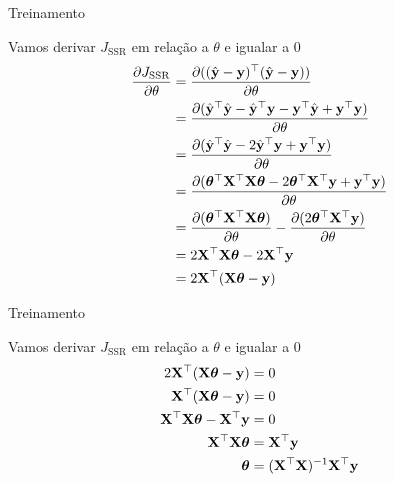 \documentclass[aspectratio=169,xcolor=dvipsnames]{beamer}
\begin{document}
\begin{frame}{Treinamento}
    
        Vamos derivar $J_{\text{SSR}}$ em relação a $\theta$ e igualar a 0
        \begin{align*}
            \frac{\partial J_{\text{SSR}}}{\partial\theta}&=\frac{\partial ((\hat{\mathbf{y}} - \mathbf{y})^\top(\hat{\mathbf{y}} - \mathbf{y}))}{\partial\theta}\\
            &=\frac{\partial (\hat{\mathbf{y}}^\top\hat{\mathbf{y}} - \hat{\mathbf{y}}^\top\mathbf{y}-\mathbf{y}^\top\hat{\mathbf{y}} + \mathbf{y}^\top\mathbf{y})}{\partial\theta}\\
            &=\frac{\partial (\hat{\mathbf{y}}^\top\hat{\mathbf{y}} - 2\hat{\mathbf{y}}^\top\mathbf{y} + \mathbf{y}^\top\mathbf{y})}{\partial\theta}\\
            &=\frac{\partial (\bm{\theta}^\top\mathbf{X}^\top\mathbf{X}\bm{\theta} - 2\bm{\theta}^\top\mathbf{X}^\top\mathbf{y} + \mathbf{y}^\top\mathbf{y})}{\partial\theta}\\
            &=\frac{\partial (\bm{\theta}^\top\mathbf{X}^\top\mathbf{X}\bm{\theta})}{\partial\theta} - \frac{\partial(2\bm{\theta}^\top\mathbf{X}^\top\mathbf{y})}{\partial\theta}\\
            &=2\mathbf{X}^\top\mathbf{X}\bm{\theta} - 2\mathbf{X}^\top\mathbf{y}\\
            &=2\mathbf{X}^\top(\mathbf{X}\bm{\theta} - \mathbf{y})
        \end{align*}
\end{frame}

\begin{frame}{Treinamento}
    
        Vamos derivar $J_{\text{SSR}}$ em relação a $\theta$ e igualar a 0
        \begin{align*}
            2\mathbf{X}^\top(\mathbf{X}\bm{\theta} - \mathbf{y}) &= 0\\
            \mathbf{X}^\top(\mathbf{X}\bm{\theta} - \mathbf{y}) &= 0\\
            \mathbf{X}^\top\mathbf{X}\bm{\theta} - \mathbf{X}^\top\mathbf{y} &= 0\\
            \mathbf{X}^\top\mathbf{X}\bm{\theta} &= \mathbf{X}^\top\mathbf{y}\\
            \bm{\theta} &= (\mathbf{X}^\top\mathbf{X})^{-1}\mathbf{X}^\top\mathbf{y}\\
        \end{align*}
\end{frame}
\end{document}
